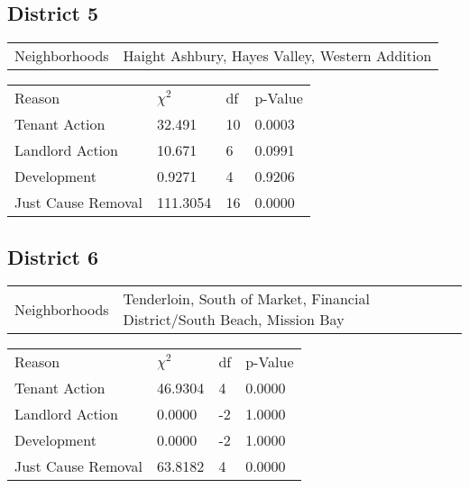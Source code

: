\documentclass[]{article}
\begin{document}
\subsection{District 5}

\begin{table}[h]
	\centering
	\begin{tabular}{l | l}
		Neighborhoods & Haight Ashbury, Hayes Valley, Western Addition \\
	\end{tabular}
\end{table}
\FloatBarrier

\begin {table}[h]
\centering
\begin{tabular}{l | l | l | l}
	
	Reason				&  $\chi ^{2}$ & df & p-Value \\
	Tenant Action 		   &  32.491   &  10 & 0.0003 \\
	Landlord Action	       &  10.671  & 6  & 0.0991 \\
	Development			   &  0.9271  &  4 & 0.9206 \\
	Just Cause Removal	   &  111.3054  & 16  & 0.0000 \\
\end{tabular} \newline
\end{table}
\FloatBarrier

\subsection{District 6}


\begin{table}[h]
	\centering
	\begin{tabular}{l | l}
		Neighborhoods & Tenderloin, South of Market, Financial District/South Beach, Mission Bay  \\
	\end{tabular}
\end{table}
\FloatBarrier

\begin {table}[h]
\centering
\begin{tabular}{l | l | l | l}
	
	Reason				 &  $\chi ^{2}$ & df & p-Value \\
	Tenant Action 		   &  46.9304  & 4  & 0.0000 \\
	Landlord Action	       &  0.0000  & -2  & 1.0000 \\
	Development			   &  0.0000  & -2  & 1.0000 \\
	Just Cause Removal	   &  63.8182  & 4  & 0.0000 \\
\end{tabular} \newline
\end{table}
\FloatBarrier
\end{document}
